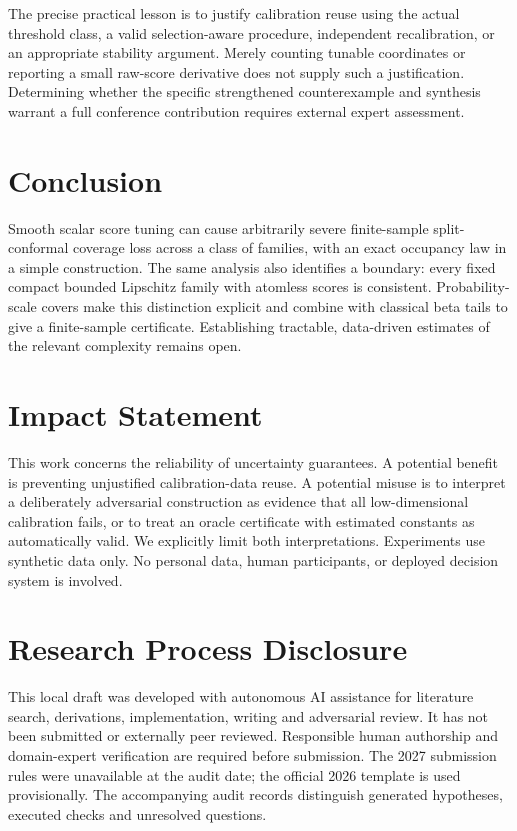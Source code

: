 \documentclass{article}
\begin{document}
The precise practical lesson is to justify calibration reuse using the actual threshold class, a valid selection-aware procedure, independent recalibration, or an appropriate stability argument. Merely counting tunable coordinates or reporting a small raw-score derivative does not supply such a justification. Determining whether the specific strengthened counterexample and synthesis warrant a full conference contribution requires external expert assessment.

\section{Conclusion}

Smooth scalar score tuning can cause arbitrarily severe finite-sample split-conformal coverage loss across a class of families, with an exact occupancy law in a simple construction. The same analysis also identifies a boundary: every fixed compact bounded Lipschitz family with atomless scores is consistent. Probability-scale covers make this distinction explicit and combine with classical beta tails to give a finite-sample certificate. Establishing tractable, data-driven estimates of the relevant complexity remains open.

\section*{Impact Statement}
This work concerns the reliability of uncertainty guarantees. A potential benefit is preventing unjustified calibration-data reuse. A potential misuse is to interpret a deliberately adversarial construction as evidence that all low-dimensional calibration fails, or to treat an oracle certificate with estimated constants as automatically valid. We explicitly limit both interpretations. Experiments use synthetic data only. No personal data, human participants, or deployed decision system is involved.

\section*{Research Process Disclosure}
This local draft was developed with autonomous AI assistance for literature search, derivations, implementation, writing and adversarial review. It has not been submitted or externally peer reviewed. Responsible human authorship and domain-expert verification are required before submission. The 2027 submission rules were unavailable at the audit date; the official 2026 template is used provisionally. The accompanying audit records distinguish generated hypotheses, executed checks and unresolved questions.
\end{document}
